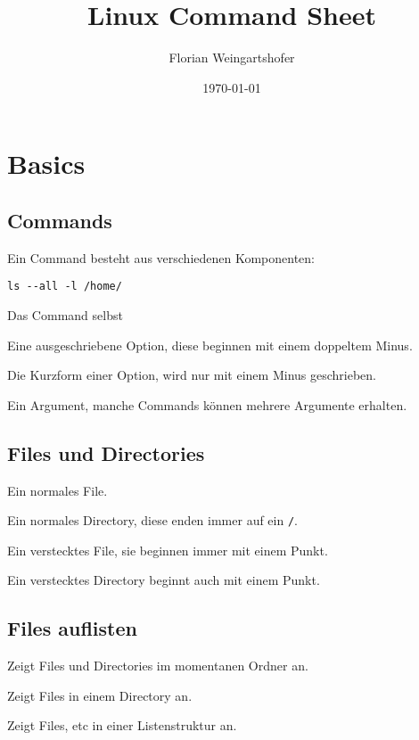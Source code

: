 \documentclass{article}
\title{Linux Command Sheet}
\author{Florian Weingartshofer}
\date{\today}
\begin{document}
\maketitle
\tableofcontents{}
\newpage
\section{Basics}
\subsection{Commands}
Ein Command besteht aus verschiedenen Komponenten:

\begin{verbatim}
ls --all -l /home/
\end{verbatim}

 Das Command selbst

Eine ausgeschriebene Option, diese beginnen mit einem doppeltem Minus.

Die Kurzform einer Option, wird nur mit einem Minus geschrieben.

Ein Argument, manche Commands können mehrere Argumente erhalten.

\subsection{Files und Directories}
Ein normales File.

Ein normales Directory, diese enden immer auf ein \texttt{/}.

Ein verstecktes File, sie beginnen immer mit einem Punkt.

Ein verstecktes Directory beginnt auch mit einem Punkt.

\subsection{Files auflisten}
Zeigt Files und Directories im momentanen Ordner an.

Zeigt Files in einem Directory an.

Zeigt Files, etc in einer Listenstruktur an.
\end{document}
